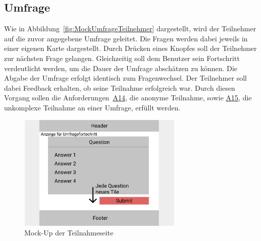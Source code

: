 \subsection{Umfrage}
\label{ssec:konzept:client:umfrage}
Wie in Abbildung~\vref{fig:MockUmfrageTeilnehmer} dargestellt, wird der Teilnehmer auf die zuvor angegebene Umfrage geleitet.
Die Fragen werden dabei jeweils in einer eigenen Karte dargestellt.
Durch Drücken eines Knopfes soll der Teilnehmer zur nächsten Frage gelangen.
Gleichzeitig soll dem Benutzer sein Fortschritt verdeutlicht werden, um die Dauer der Umfrage abschätzen zu können.
Die Abgabe der Umfrage erfolgt identisch zum Fragenwechsel.
Der Teilnehmer soll dabei Feedback erhalten, ob seine Teilnahme erfolgreich war.
Durch diesen Vorgang sollen die Anforderungen~\hyperref[Anf:A14]{A14}, die anonyme Teilnahme, sowie \hyperref[Anf:15]{A15}, die unkomplexe Teilnahme an einer Umfrage, erfüllt werden.

\begin{figure}[H]
	\centering
	\includegraphics[width=0.7\textwidth]{img/konzeption/client/umfrage_teilnehmer}
	\captionsetup{justification=centering, format=plain}
	\caption[Mock-Up der Teilnahmeseite]{Mock-Up der Teilnahmeseite\\\figma}
	\label{fig:MockUmfrageTeilnehmer}
\end{figure}

